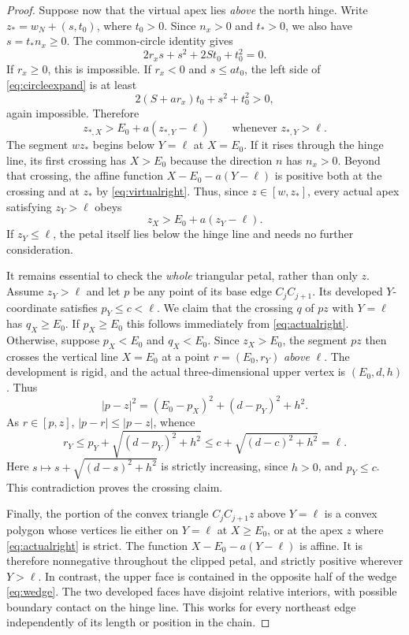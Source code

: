 \documentclass[a4paper,11pt]{amsart}
\begin{document}
\begin{proof}
Suppose now that the virtual apex lies \emph{above} the north hinge. Write
$z_*=w_N+(s,t_0)$, where $t_0>0$. Since $n_x>0$ and $t_*>0$, we also have $s=t_*n_x\geq0$. The common-circle identity gives
\begin{equation}\label{eq:circleexpand}
 2r_xs+s^2+2St_0+t_0^2=0.
\end{equation}
If $r_x\geq0$, this is impossible. If $r_x<0$ and $s\leq at_0$, the left side of \eqref{eq:circleexpand} is at least
\[
 2(S+ar_x)t_0+s^2+t_0^2>0,
\]
again impossible. Therefore
\begin{equation}\label{eq:virtualright}
 z_{*,X}>E_0+a(z_{*,Y}-\ell)
       \qquad\text{whenever }z_{*,Y}>\ell.
\end{equation}
The segment $wz_*$ begins below $Y=\ell$ at $X=E_0$. If it rises through the hinge line, its first crossing has $X>E_0$ because the direction $n$ has $n_x>0$. Beyond that crossing, the affine function $X-E_0-a(Y-\ell)$ is positive both at the crossing and at $z_*$ by \eqref{eq:virtualright}. Thus, since $z\in[w,z_*]$, every actual apex satisfying $z_Y>\ell$ obeys
\begin{equation}\label{eq:actualright}
 z_X>E_0+a(z_Y-\ell).
\end{equation}
If $z_Y\leq\ell$, the petal itself lies below the hinge line and needs no further consideration.

It remains essential to check the \emph{whole} triangular petal, rather than only $z$. Assume $z_Y>\ell$ and let $p$ be any point of its base edge $C_jC_{j+1}$. Its developed $Y$-coordinate satisfies $p_Y\leq c<\ell$. We claim that the crossing $q$ of $pz$ with $Y=\ell$ has $q_X\geq E_0$. If $p_X\geq E_0$ this follows immediately from \eqref{eq:actualright}. Otherwise, suppose $p_X<E_0$ and $q_X<E_0$. Since $z_X>E_0$, the segment $pz$ then crosses the vertical line $X=E_0$ at a point $r=(E_0,r_Y)$ \emph{above} $\ell$. The development is rigid, and the actual three-dimensional upper vertex is $(E_0,d,h)$. Thus
\begin{equation}\label{eq:rigiddist}
 |p-z|^2=(E_0-p_X)^2+(d-p_Y)^2+h^2.
\end{equation}
As $r\in[p,z]$, $|p-r|\leq|p-z|$, whence
\[
 r_Y\leq p_Y+\sqrt{(d-p_Y)^2+h^2}
 \leq c+\sqrt{(d-c)^2+h^2}=\ell.
\]
Here $s\mapsto s+\sqrt{(d-s)^2+h^2}$ is strictly increasing, since $h>0$, and $p_Y\leq c$. This contradiction proves the crossing claim.

Finally, the portion of the convex triangle $C_jC_{j+1}z$ above $Y=\ell$ is a convex polygon whose vertices lie either on $Y=\ell$ at $X\geq E_0$, or at the apex $z$ where \eqref{eq:actualright} is strict. The function $X-E_0-a(Y-\ell)$ is affine. It is therefore nonnegative throughout the clipped petal, and strictly positive wherever $Y>\ell$. In contrast, the upper face is contained in the opposite half of the wedge \eqref{eq:wedge}. The two developed faces have disjoint relative interiors, with possible boundary contact on the hinge line. This works for every northeast edge independently of its length or position in the chain.
\end{proof}
\end{document}
